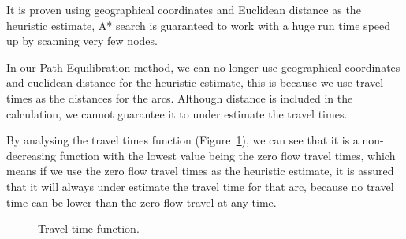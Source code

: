 It is proven using geographical coordinates and Euclidean distance as the heuristic estimate,
A* search is guaranteed to work with a huge run time speed up by scanning very few nodes.

In our Path Equilibration method,
we can no longer use geographical coordinates and euclidean distance for the heuristic estimate,
this is because we use travel times as the distances for the arcs.
Although distance is included in the calculation,
we cannot guarantee it to under estimate the travel times.

By analysing the travel times function (Figure~\ref{fig:flowfunction}),
we can see that it is a non-decreasing function with the lowest value being the zero flow travel times,
which means if we use the zero flow travel times as the heuristic estimate,
it is assured that it will always under estimate the travel time for that arc,
because no travel time can be lower than the zero flow travel at any time.

\begin{figure}[H]
    \centering
    \caption{Travel time function.}
    \label{fig:flowfunction}
\end{figure}

